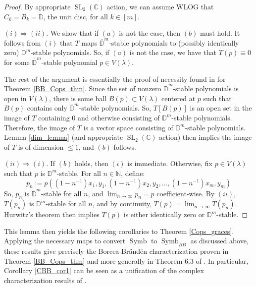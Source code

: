 \documentclass{article}
\theoremstyle{definition}
\theoremstyle{plain}
\newcommand{\C}{\mathbb{C}}
\newcommand{\N}{\mathbb{N}}
\newcommand{\D}{\mathbb{D}}
\DeclareMathOperator{\Symb}{Symb}
\DeclareMathOperator{\SL}{SL}
\begin{document}
\begin{proof}
    By appropriate $\SL_2(\C)$ action, we can assume WLOG that $C_k = B_k = \D$, the unit disc, for all $k \in [m]$.
    
    $(i) \Rightarrow (ii)$. We show that if $(a)$ is not the case, then $(b)$ must hold. It follows from $(i)$ that $T$ maps $\overline{\D}^m$-stable polynomials to (possibly identically zero) $\D^m$-stable polynomials. So, if $(a)$ is not the case, we have that $T(p) \equiv 0$ for some $\overline{\D}^m$-stable polynomial $p \in V(\lambda)$.
    
    The rest of the argument is essentially the proof of necessity found in \cite{bb1} for Theorem \ref{BB_Cops_thm}. Since the set of nonzero $\overline{\D}^m$-stable polynomials is open in $V(\lambda)$, there is some ball $B(p) \subset V(\lambda)$ centered at $p$ such that $B(p)$ contains only $\overline{\D}^m$-stable polynomials. So, $T[B(p)]$ is an open set in the image of $T$ containing 0 and otherwise consisting of $\D^m$-stable polynomials. Therefore, the image of $T$ is a vector space consisting of $\D^m$-stable polynomials. Lemma \ref{dim_lemma} (and appropriate $\SL_2(\C)$ action) then implies the image of $T$ is of dimension $\leq 1$, and $(b)$ follows.
    
    $(ii) \Rightarrow (i)$. If $(b)$ holds, then $(i)$ is immediate. Otherwise, fix $p \in V(\lambda)$ such that $p$ is $\D^m$-stable. For all $n \in \N$, define:
    \[
        p_n := p((1-n^{-1})x_1, y_1, (1-n^{-1})x_2, y_2, \ldots, (1-n^{-1})x_m, y_m)
    \]
    So, $p_n$ is $\overline{\D}^m$-stable for all $n$, and $\lim_{n \rightarrow \infty} p_n = p$ coefficient-wise. By $(ii)$, $T(p_n)$ is $\D^m$-stable for all $n$, and by continuity, $T(p) = \lim_{n \rightarrow \infty} T(p_n)$. Hurwitz's theorem then implies $T(p)$ is either identically zero or $\D^m$-stable.
\end{proof}

This lemma then yields the following corollaries to Theorem \ref{Cops_graces}. Applying the necessary maps to convert $\Symb$ to $\Symb_{BB}$ as discussed above, these results give precisely the Borcea-Br{\"a}nd{\'e}n characterization proven in Theorem \ref{BB_Cops_thm} and more generally in Theorem 6.3 of \cite{bb1}. In particular, Corollary \ref{CBB_cor1} can be seen as a unification of the complex characterization results of \cite{bb1}.
\end{document}
